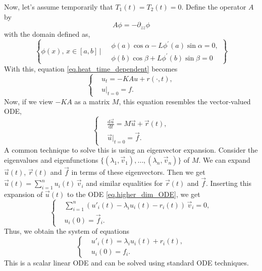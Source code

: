 Now, let's assume temporarily that $T_1(t) = T_2(t) = 0$. Define the operator $A$ by
\begin{equation}
    A \phi = - \partial_{zz}\phi
\end{equation}
with the domain defined as,
\begin{equation}
    \left\{\phi(x),\, x\in [a, b]\,\Bigg|\begin{aligned}
        &\ \phi(a) \cos \alpha-L \phi^{\prime}(a) \sin \alpha=0,
        \\
        &\ \phi(b) \cos \beta+L \phi^{\prime}(b) \sin \beta=0
    \end{aligned}
    \right\}
\end{equation}
With this, equation \eqref{eq.heat_time_dependent} becomes 
\begin{equation}\label{eq.heat_time_dependent'}
    \left\{\begin{aligned} 
        &u_t= - KA u + r(\cdot, t), 
        \\
        &u|_{t = 0}=f.
    \end{aligned}\right.
\end{equation}
Now, if we view $- KA$ as a matrix $M$, this equation resembles the vector-valued ODE,
\begin{equation}\label{eq.higher_dim_ODE}
    \left\{\begin{aligned} 
        &\frac{\mathrm{d}\vec{u}}{\mathrm{d}t} = M\vec{u} + \vec{r}(t), 
        \\
        &\vec{u}|_{t = 0}=\vec{f}.
    \end{aligned}\right.
\end{equation}
A common technique to solve this is using an eigenvector expansion. Consider the eigenvalues and eigenfunctions $\{(\lambda_1, \vec{v}_1), \dots, (\lambda_n, \vec{v}_n)\}$ of $M$. We can expand $\vec{u}(t)$, $\vec{r}(t)$ and $\vec{f}$ in terms of these eigenvectors. Then we get $\vec{u}(t) = \sum_{i = 1}^n u_i(t)\, \vec{v}_i$ and similar equalities for $\vec{r}(t)$ and $\vec{f}$. Inserting this expansion of $\vec{u}(t)$ to the ODE \eqref{eq.higher_dim_ODE}, we get
\begin{equation}
    \left\{\begin{aligned} 
        &\sum_{i = 1}^n (u'_i(t) - \lambda_i u_i(t) - r_i(t))\, \vec{v}_i = 0, 
        \\
        &u_i(0)=\vec{f}_i.
    \end{aligned}\right.
\end{equation}
Thus, we obtain the system of equations
\begin{equation}
    \left\{\begin{aligned} 
        &u'_i(t) = \lambda_i u_i(t) + r_i(t), 
        \\
        &u_i(0)=f_i.
    \end{aligned}\right.
\end{equation}
This is a scalar linear ODE and can be solved using standard ODE techniques.

